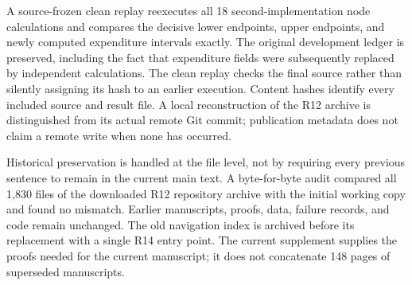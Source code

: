 A source-frozen clean replay reexecutes all 18 second-implementation node calculations and compares the decisive lower endpoints, upper endpoints, and newly computed expenditure intervals exactly. The original development ledger is preserved, including the fact that expenditure fields were subsequently replaced by independent calculations. The clean replay checks the final source rather than silently assigning its hash to an earlier execution. Content hashes identify every included source and result file. A local reconstruction of the R12 archive is distinguished from its actual remote Git commit; publication metadata does not claim a remote write when none has occurred.

Historical preservation is handled at the file level, not by requiring every previous sentence to remain in the current main text. A byte-for-byte audit compared all 1,830 files of the downloaded R12 repository archive with the initial working copy and found no mismatch. Earlier manuscripts, proofs, data, failure records, and code remain unchanged. The old navigation index is archived before its replacement with a single R14 entry point. The current supplement supplies the proofs needed for the current manuscript; it does not concatenate 148 pages of superseded manuscripts.

